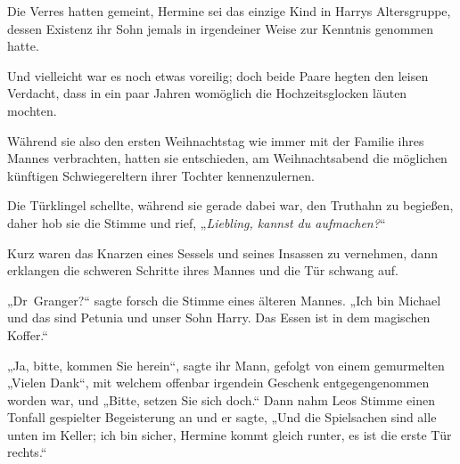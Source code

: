Die Verres hatten gemeint, Hermine sei das einzige Kind in Harrys Altersgruppe, dessen Existenz ihr Sohn jemals in irgendeiner Weise zur Kenntnis genommen hatte.

Und vielleicht war es noch etwas voreilig; doch beide Paare hegten den leisen Verdacht, dass in ein paar Jahren womöglich die Hochzeitsglocken läuten mochten.

Während sie also den ersten Weihnachtstag wie immer mit der Familie ihres Mannes verbrachten, hatten sie entschieden, am Weihnachtsabend die möglichen künftigen Schwiegereltern ihrer Tochter kennenzulernen.

Die Türklingel schellte, während sie gerade dabei war, den Truthahn zu begießen, daher hob sie die Stimme und rief,
„\emph{Liebling, kannst du aufmachen?}“

Kurz waren das Knarzen eines Sessels und seines Insassen zu vernehmen, dann erklangen die schweren Schritte ihres Mannes und die Tür schwang auf.

„Dr~Granger?“ sagte forsch die Stimme eines älteren Mannes.
„Ich bin Michael und das sind Petunia und unser Sohn Harry. Das Essen ist in dem magischen Koffer.“

„Ja, bitte, kommen Sie herein“, sagte ihr Mann, gefolgt von einem gemurmelten
„Vielen Dank“, mit welchem offenbar irgendein Geschenk entgegengenommen worden war, und
„Bitte, setzen Sie sich doch.“ Dann nahm Leos Stimme einen Tonfall gespielter Begeisterung an und er sagte,
„Und die Spielsachen sind alle unten im Keller; ich bin sicher, Hermine kommt gleich runter, es ist die erste Tür rechts.“

